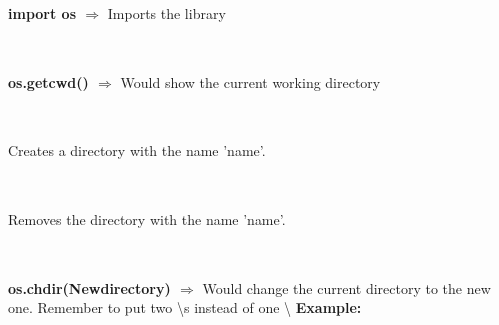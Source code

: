 \documentclass[a4paper,18pt]{article}
\begin{document}
\section{\colorbox {Abi}{}}

\subsection{\colorbox {matgreen}{\color{white}{\large import os}}}
\textbf{import os $\Rightarrow$} Imports the library\\\\


\subsection{\colorbox {matgreen}{\color{white}{\large os.getcwd()}}}
\textbf{os.getcwd() $\Rightarrow$} Would show the current working directory\\\\


\subsection{\colorbox {matgreen}{\color{white}{\large os.mkdir('name')}}}
Creates a directory with the name 'name'.\\\\


\subsection{\colorbox {matgreen}{\color{white}{\large os.removedirs('name')}}}
Removes the directory with the name 'name'.\\\\


\subsection{\colorbox {matgreen}{\color{white}{\large os.chdir(Newdirectory)}}}
\textbf{os.chdir(Newdirectory) $\Rightarrow$} Would change the current directory to the new one. Remember to put two \textbackslash s instead of one \textbackslash
\textbf{Example:\\}
\end{document}
